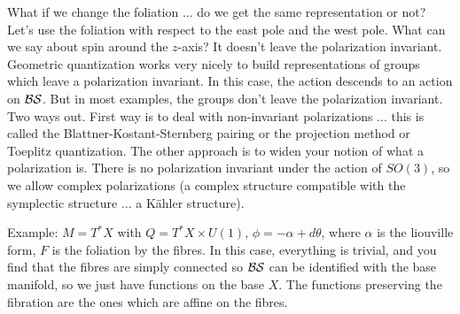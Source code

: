  What if we change the foliation ... do we get the same representation or not?  Let's
 use the foliation with respect to the east pole and the west pole.  What can we say
 about spin around the $z$-axis?  It doesn't leave the polarization invariant.
 Geometric quantization works very nicely to build representations of groups which
 leave a polarization invariant.  In this case, the action descends to an action on
 $\mathcal{BS}$.  But in most examples, the groups don't leave the polarization invariant.  Two
 ways out.  First way is to deal with non-invariant polarizations ... this is called
 the Blattner-Kostant-Sternberg pairing or the projection method or Toeplitz
 quantization.  The other approach is to widen your notion of what a polarization is.
 There is no polarization invariant under the action of $SO(3)$, so we allow complex
 polarizations (a complex structure compatible with the symplectic structure ... a
 K\"ahler structure).

 Example: $M=T^*X$ with $Q=T^*X\times U(1)$, $\phi=-\alpha + d\theta$, where $\alpha$
 is the liouville form, $F$ is the foliation by the fibres.  In this case, everything
 is trivial, and you find that the fibres are simply connected so $\mathcal{BS}$ can be
 identified with the base manifold, so we just have functions on the base $X$.  The
 functions preserving the fibration are the ones which are affine on the fibres.
